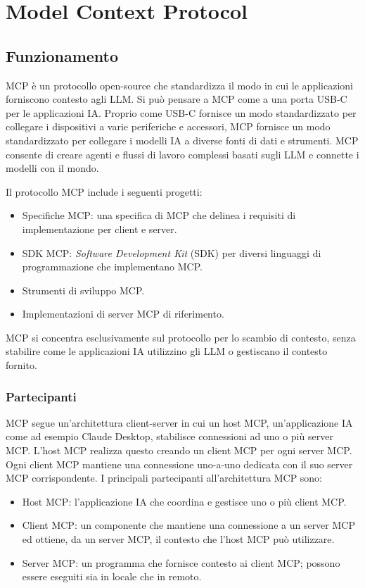 \chapter{Model Context Protocol}

\section{Funzionamento}

MCP è un protocollo open-source che standardizza il modo in cui le applicazioni forniscono contesto agli LLM. Si può pensare a MCP come a una porta USB-C per le applicazioni IA. Proprio come USB-C fornisce un modo standardizzato per collegare i dispositivi a varie periferiche e accessori, MCP fornisce un modo standardizzato per collegare i modelli IA a diverse fonti di dati e strumenti. MCP consente di creare agenti e flussi di lavoro complessi basati sugli LLM e connette i modelli con il mondo. 
\cite{modelcontextprotocol2024intro}

Il protocollo MCP include i seguenti progetti:
\begin{itemize}
\item Specifiche MCP: una specifica di MCP che delinea i requisiti di implementazione per client e server.
\item SDK MCP: \textit{Software Development Kit} (SDK) per diversi linguaggi di programmazione che implementano MCP.
\item Strumenti di sviluppo MCP.
\item Implementazioni di server MCP di riferimento.
\end{itemize}
MCP si concentra esclusivamente sul protocollo per lo scambio di contesto, senza stabilire come le applicazioni IA utilizzino gli LLM o gestiscano il contesto fornito.
\cite{modelcontextprotocol2024arch}

\subsection{Partecipanti}
MCP segue un'architettura client-server in cui un host MCP, un'applicazione IA come ad esempio Claude Desktop, stabilisce connessioni ad uno o più server MCP. L'host MCP realizza questo creando un client MCP per ogni server MCP. Ogni client MCP mantiene una connessione uno-a-uno dedicata con il suo server MCP corrispondente.
I principali partecipanti all'architettura MCP sono:
\begin{itemize}
\item Host MCP: l'applicazione IA che coordina e gestisce uno o più client MCP.
\item Client MCP: un componente che mantiene una connessione a un server MCP ed ottiene, da un server MCP, il contesto che l'host MCP può utilizzare.
\item Server MCP: un programma che fornisce contesto ai client MCP; possono essere eseguiti sia in locale che in remoto.
\cite{modelcontextprotocol2024arch}
\end{itemize}

